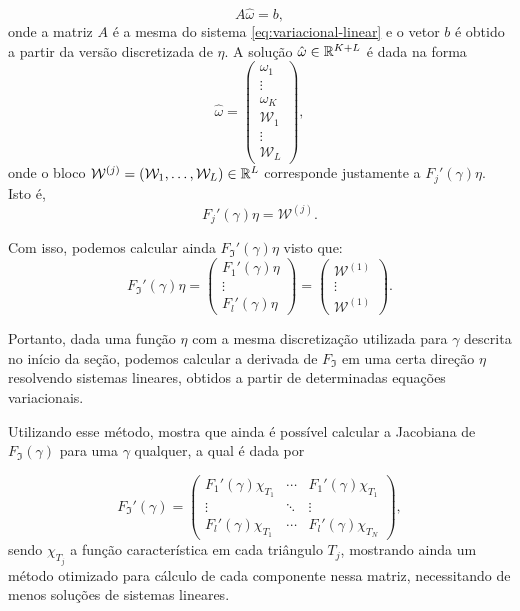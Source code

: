 \begin{equation}
    A \hat \omega  = b,
\end{equation}
onde a matriz $A$ é a mesma do sistema \eqref{eq:variacional-linear} e o vetor $b$ é obtido a partir da versão discretizada de $\eta$. A solução $\hat \omega \in \mathbb{R}^{K +L}$ é dada na forma
\begin{equation} \label{eq:solucao-derivada-variacional}
    \hat \omega  = \begin{pmatrix}
        \omega_1 \\
        \vdots \\
        \omega_K \\
        \mathcal W_1 \\
        \vdots \\
        \mathcal W_L
    \end{pmatrix},
\end{equation}
onde o bloco $\mathcal{W}^{(j)} = (\mathcal W_1, \dots, \mathcal W_L)\in \mathbb{R}^L$ corresponde justamente a $F_j'(\gamma) \eta$. Isto é, 
\begin{equation}
    F_j'(\gamma) \eta = \mathcal{W}^{(j)}.
\end{equation}

Com isso, podemos calcular ainda $F_{\mathfrak I}'(\gamma) \eta$ visto que:
\begin{equation}
   F_{\mathfrak I}'(\gamma) \eta = \begin{pmatrix}
        F_1'(\gamma)\eta \\
        \vdots \\
        F_l'(\gamma)\eta
    \end{pmatrix} = \begin{pmatrix}
        \mathcal W^{(1)} \\
        \vdots \\
        \mathcal W^{(1)}
    \end{pmatrix}.
\end{equation}

Portanto, dada uma função $\eta$ com a mesma discretização utilizada para $\gamma$ descrita no início da seção, podemos calcular a derivada de $F_{\mathfrak I}$ em uma certa direção $\eta$ resolvendo sistemas lineares, obtidos a partir de determinadas equações variacionais.

Utilizando esse método,  mostra que ainda é possível calcular a Jacobiana de $F_{\mathfrak I}(\gamma)$ para uma $\gamma$ qualquer, a qual é dada por

\begin{equation}
    F_{\mathfrak I}'(\gamma) = \begin{pmatrix}
        F_1'(\gamma) \chi_{T_1} & \cdots & F_1'(\gamma) \chi_{T_1} \\
        \vdots & \ddots & \vdots \\
        F_l'(\gamma) \chi_{T_1} & \cdots & F_l'(\gamma) \chi_{T_N}
    \end{pmatrix},
\end{equation}
sendo $\chi_{T_j}$ a função característica em cada triângulo $T_j$, mostrando ainda um método otimizado para cálculo de cada componente nessa matriz, necessitando de menos soluções de sistemas lineares.


